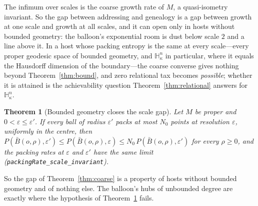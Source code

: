 \documentclass[11pt,reqno]{amsart}
\theoremstyle{plain}
\newtheorem{theorem}{Theorem}[section]
\theoremstyle{definition}
\newcommand{\Hk}{\mathbb{H}^n_\kappa}
\newcommand{\eps}{\varepsilon}
\begin{document}
The infimum over scales is the coarse growth rate of $M$, a quasi-isometry invariant. So the gap between addressing and genealogy is a gap between growth at one scale and growth at all scales, and it can open only in hosts without bounded geometry: the balloon's exponential room is dust below scale $2$ and a line above it. In a host whose packing entropy is the same at every scale---every proper geodesic space of bounded geometry, and $\Hk$ in particular, where it equals the Hausdorff dimension of the boundary---the coarse converse gives nothing beyond Theorem~\ref{thm:bound}, and zero relational tax becomes \emph{possible}; whether it is attained is the achievability question Theorem~\ref{thm:relational} answers for $\Hk$.

\begin{theorem}[Bounded geometry closes the scale gap]\label{thm:scaleinv}
Let $M$ be proper and $0<\eps\le\eps'$. If every ball of radius $\eps'$ packs at most $N_0$ points at resolution $\eps$, uniformly in the centre, then $P(\bar B(o,\rho),\eps')\le P(\bar B(o,\rho),\eps)\le N_0\,P(\bar B(o,\rho),\eps')$ for every $\rho\ge0$, and the packing rates at $\eps$ and $\eps'$ have the same limit (\texttt{packingRate\_\allowbreak{}scale\_\allowbreak{}invariant}).
\end{theorem}

So the gap of Theorem~\ref{thm:coarse} is a property of hosts without bounded geometry and of nothing else. The balloon's hubs of unbounded degree are exactly where the hypothesis of Theorem~\ref{thm:scaleinv} fails.
\end{document}
